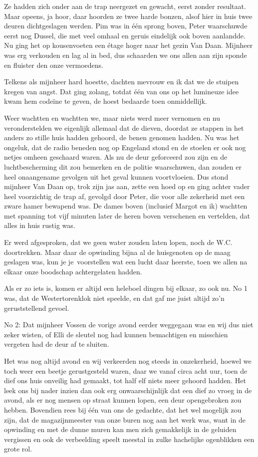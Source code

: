 \documentclass{book}
\begin{document}
Ze hadden zich onder aan de trap neergezet en gewacht, eerst zonder resultaat.
Maar opeens, ja hoor, daar hoorden ze twee harde bonzen, alsof hier in huis twee
deuren dichtgeslagen werden. Pim was in één sprong boven, Peter waarschuwde
eerst nog Dussel, die met veel omhaal en geruis eindelijk ook boven aanlandde.
Nu ging het op kousenvoeten een étage hoger naar het gezin Van Daan. Mijnheer
was erg verkouden en lag al in bed, dus schaarden we ons allen aan zijn sponde
en fluister den onze vermoedens.

Telkens als mijnheer hard hoestte, dachten mevrouw en ik dat we de stuipen
kregen van angst. Dat ging zolang, totdat één van ons op het lumineuze idee kwam
hem codeïne te geven, de hoest bedaarde toen onmiddellijk.

Weer wachtten en wachtten we, maar niets werd meer vernomen en nu
veronderstelden we eigenlijk allemaal dat de dieven, doordat ze stappen in het
anders zo stille huis hadden gehoord, de benen genomen hadden. Nu was het
ongeluk, dat de radio beneden nog op Engeland stond en de stoelen er ook nog
netjes omheen geschaard waren. Als nu de deur geforceerd zou zijn en de
luchtbescherming dit zou bemerken en de politie waarschuwen, dan zouden er heel
onaangename gevolgen uit het geval kunnen voortvloeien. Dus stond mijnheer Van
Daan op, trok zijn jas aan, zette een hoed op en ging achter vader heel
voorzichtig de trap af, gevolgd door Peter, die voor alle zekerheid met een
zware hamer bewapend was. De dames boven (inclusief Margot en ik) wachtten met
spanning tot vijf minuten later de heren boven verschenen en vertelden, dat
alles in huis rustig was.

Er werd afgesproken, dat we geen water zouden laten lopen, noch de W.C.
doortrekken. Maar daar de opwinding bijna al de huisgenoten op de maag geslagen
was, kun je je~voorstellen wat een lucht daar heerste, toen we allen na elkaar
onze boodschap achtergelaten hadden.

Als er zo iets is, komen er altijd een heleboel dingen bij elkaar, zo ook nu. No
1 was, dat de Westertorenklok niet speelde, en dat gaf me juist altijd zo'n
geruststellend gevoel.

No 2: Dat mijnheer Vossen de vorige avond eerder weggegaan was en wij dus niet
zeker wisten, of Elli de sleutel nog had kunnen bemachtigen en misschien
vergeten had de deur af te sluiten.

Het was nog altijd avond en wij verkeerden nog steeds in onzekerheid, hoewel we
toch weer een beetje gerustgesteld waren, daar we vanaf circa acht uur, toen de
dief ons huis onveilig had gemaakt, tot half elf niets meer gehoord hadden. Het
leek ons bij nader inzien dan ook erg onwaarschijnlijk dat een dief zo vroeg in
de avond, als er nog mensen op straat kunnen lopen, een deur opengebroken zou
hebben. Bovendien rees bij één van ons de gedachte, dat het wel mogelijk zou
zijn, dat de magazijnmeester van onze buren nog aan het werk was, want in de
opwinding en met de dunne muren kan men zich gemakkelijk in de geluiden
vergissen en ook de verbeelding speelt meestal in zulke hachelijke ogenblikken
een grote rol.
\end{document}
